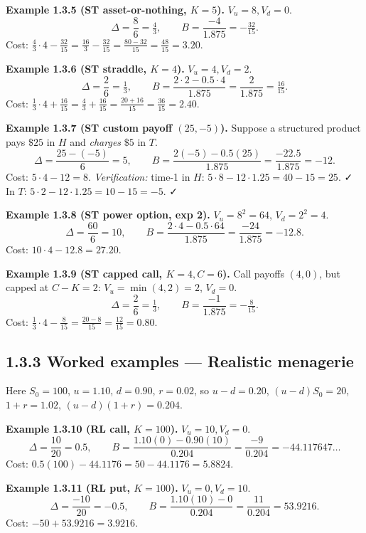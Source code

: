 \documentclass[
  10pt,
  twoside]{book}
\begin{document}
\textbf{Example 1.3.5 (ST asset-or-nothing, \(K=5\)).} \(V_u=8, V_d=0\).
\[\Delta = \frac{8}{6} = \tfrac{4}{3}, \qquad B = \frac{-4}{1.875} = -\tfrac{32}{15}.\]
Cost:
\(\tfrac{4}{3}\cdot 4 - \tfrac{32}{15} = \tfrac{16}{3} - \tfrac{32}{15} = \tfrac{80-32}{15} = \tfrac{48}{15} = 3.20\).

\textbf{Example 1.3.6 (ST straddle, \(K=4\)).} \(V_u=4, V_d=2\).
\[\Delta = \frac{2}{6} = \tfrac{1}{3}, \qquad B = \frac{2\cdot 2 - 0.5\cdot 4}{1.875} = \frac{2}{1.875} = \tfrac{16}{15}.\]
Cost:
\(\tfrac{1}{3}\cdot 4 + \tfrac{16}{15} = \tfrac{4}{3} + \tfrac{16}{15} = \tfrac{20+16}{15} = \tfrac{36}{15} = 2.40\).

\textbf{Example 1.3.7 (ST custom payoff \((25,-5)\)).} Suppose a
structured product pays \(\$25\) in \(H\) and \emph{charges} \(\$5\) in
\(T\).
\[\Delta = \frac{25-(-5)}{6} = 5, \qquad B = \frac{2(-5) - 0.5(25)}{1.875} = \frac{-22.5}{1.875} = -12.\]
Cost: \(5\cdot 4 - 12 = 8.\) \emph{Verification:} time-1 in \(H\):
\(5\cdot 8 -12\cdot 1.25 = 40-15 = 25\). ✓ In \(T\):
\(5\cdot 2 - 12\cdot 1.25 = 10-15 = -5\). ✓

\textbf{Example 1.3.8 (ST power option, exp 2).} \(V_u=8^2=64\),
\(V_d=2^2=4\).
\[\Delta = \frac{60}{6} = 10, \qquad B = \frac{2\cdot 4 - 0.5\cdot 64}{1.875} = \frac{-24}{1.875} = -12.8.\]
Cost: \(10\cdot 4 - 12.8 = 27.20\).

\textbf{Example 1.3.9 (ST capped call, \(K=4,C=6\)).} Call payoffs
\((4,0)\), but capped at \(C-K=2\): \(V_u=\min(4,2)=2\), \(V_d=0\).
\[\Delta = \frac{2}{6} = \tfrac{1}{3}, \qquad B = \frac{-1}{1.875} = -\tfrac{8}{15}.\]
Cost:
\(\tfrac{1}{3}\cdot 4 - \tfrac{8}{15} = \tfrac{20-8}{15} = \tfrac{12}{15} = 0.80\).

\subsection{1.3.3 Worked examples --- Realistic
menagerie}\label{worked-examples-realistic-menagerie}

Here \(S_0=100\), \(u=1.10\), \(d=0.90\), \(r=0.02\), so \(u-d=0.20\),
\((u-d)S_0 = 20\), \(1+r=1.02\), \((u-d)(1+r)=0.204\).

\textbf{Example 1.3.10 (RL call, \(K=100\)).} \(V_u=10, V_d=0\).
\[\Delta = \frac{10}{20} = 0.5, \qquad B = \frac{1.10(0) - 0.90(10)}{0.204} = \frac{-9}{0.204} = -44.117647\ldots\]
Cost: \(0.5(100) - 44.1176 = 50 - 44.1176 = \boxed{5.8824}\).

\textbf{Example 1.3.11 (RL put, \(K=100\)).} \(V_u=0, V_d=10\).
\[\Delta = \frac{-10}{20} = -0.5, \qquad B = \frac{1.10(10) - 0}{0.204} = \frac{11}{0.204} = 53.9216.\]
Cost: \(-50 + 53.9216 = \boxed{3.9216}\).
\end{document}
